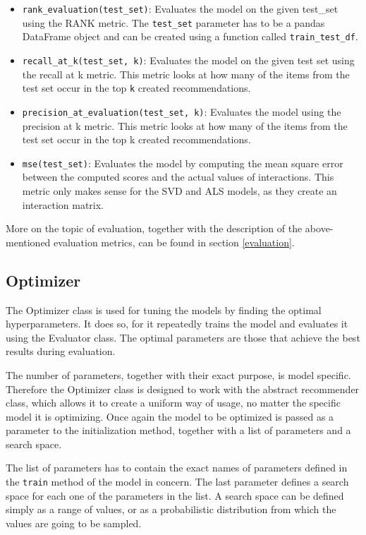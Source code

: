 \begin{itemize}
    \item \texttt{rank\_evaluation(test\_set)}: Evaluates the model on the given test\_set using the RANK metric. The \texttt{test\_set} parameter has to be a pandas DataFrame object and can be created using a function called \texttt{train\_test\_df}.
    
    \item \texttt{recall\_at\_k(test\_set, k)}: Evaluates the model on the given test set using the recall at k metric. This metric looks at how many of the items from the test set occur in the top \texttt{k} created recommendations.
    
    \item \texttt{precision\_at\_evaluation(test\_set, k)}: Evaluates the model using the precision at k metric. This metric looks at how many of the items from the test set occur in the top k created recommendations.
    
    \item \texttt{mse(test\_set)}: Evaluates the model by computing the mean square error between the computed scores and the actual values of interactions. This metric only makes sense for the SVD and ALS models, as they create an interaction matrix. 
\end{itemize}
More on the topic of evaluation, together with the description of the above-mentioned evaluation metrics, can be found in section \ref{evaluation}.

\subsection*{Optimizer}
The Optimizer class is used for tuning the models by finding the optimal hyperparameters. It does so, for it repeatedly trains the model and evaluates it using the Evaluator class. The optimal parameters are those that achieve the best results during evaluation. 

The number of parameters, together with their exact purpose, is model specific. Therefore the Optimizer class is designed to work with the abstract recommender class, which allows it to create a uniform way of usage, no matter the specific model it is optimizing. Once again the model to be optimized is passed as a parameter to the initialization method, together with a list of parameters and a search space.

The list of parameters has to contain the exact names of parameters defined in the \texttt{train} method of the model in concern. The last parameter defines a search space for each one of the parameters in the list. A search space can be defined simply as a range of values, or as a probabilistic distribution from which the values are going to be sampled. 

